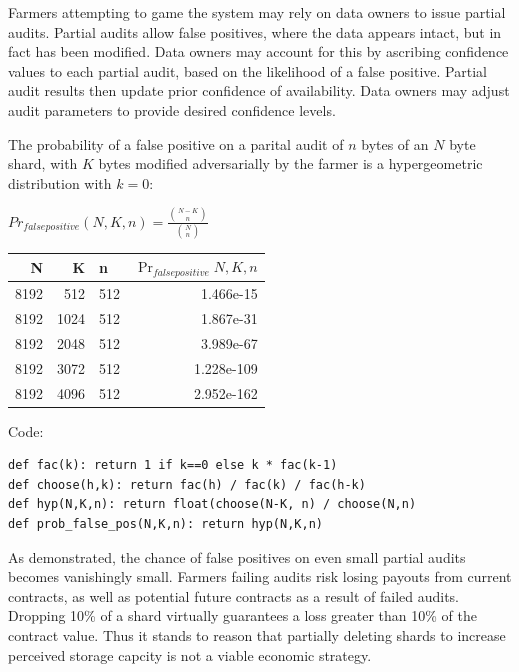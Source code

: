 \documentclass[a4paper,10pt]{article}
\begin{document}
Farmers attempting to game the system may rely on data owners to issue partial
audits. Partial audits allow false positives, where the data appears intact, but
in fact has been modified. Data owners may account for this by ascribing
confidence values to each partial audit, based on the likelihood of a false
positive. Partial audit results then update prior confidence of availability.
Data owners may adjust audit parameters to provide desired confidence levels.

The probability of a false positive on a parital audit of $ n $ bytes of an $ N
$ byte shard, with $ K $ bytes modified adversarially by the farmer is a
hypergeometric distribution with $ k = 0 $:

{\centering
$Pr_{false positive}(N,K,n) = \displaystyle \frac{{N-K \choose n}} {{N \choose
n}}$
\\}

\begin{table}[hbt!]
\begin{center}
\begin{tabular}{r r l r}
N & K & n & $\Pr_{falsepositive}{N,K,n}$\\
\hline 8192 & 512  & 512 & 1.466e-15\\
\hline 8192 & 1024 & 512 & 1.867e-31\\
\hline 8192 & 2048 & 512 & 3.989e-67\\
\hline 8192 & 3072 & 512 & 1.228e-109\\
\hline 8192 & 4096 & 512 & 2.952e-162\\
\end{tabular}
\end{center}
\end{table}

Code:
\begin{lstlisting}
def fac(k): return 1 if k==0 else k * fac(k-1)
def choose(h,k): return fac(h) / fac(k) / fac(h-k)
def hyp(N,K,n): return float(choose(N-K, n) / choose(N,n)
def prob_false_pos(N,K,n): return hyp(N,K,n)
\end{lstlisting}

As demonstrated, the chance of false positives on even small partial audits
becomes vanishingly small. Farmers failing audits risk losing payouts from
current contracts, as well as potential future contracts as a result of failed
audits. Dropping 10\% of a shard virtually guarantees a loss greater than 10\%
of the contract value. Thus it stands to reason that partially deleting shards
to increase perceived storage capcity is not a viable economic strategy.
\end{document}
